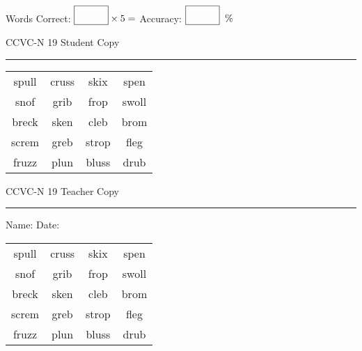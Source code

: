 \documentclass{memoir}
\begin{document}
\small

Words Correct: $\fbox{\phantom{\huge 100}} \times 5 = $ Accuracy: $\fbox{\phantom{\huge 100}}\;\; \%$ 

\vfill

\newpage


\footnotesize \noindent
CCVC-N 19 \hfill Student Copy
\smallskip
\hrule

\Large

\setlength{\tabcolsep}{14pt}
\def\arraystretch{3}

{\selectfont


\begin{vplace}[0.5]
\begin{center}
\begin{tabular}{cccc}
spull & cruss & skix & spen \\
snof & grib                    & frop & swoll \\
breck       & sken & cleb & brom          \\
screm & greb & strop & fleg             \\
fruzz & plun & bluss & drub             \\
\end{tabular}
\end{center}
\end{vplace}

}

\newpage

\footnotesize \noindent
CCVC-N 19 \hfill Teacher Copy
\smallskip
\hrule

\small

\vfill

\noindent
Name: \underline{\hspace{1.75in}} \hfill Date: \underline{\hspace{1in}}

\Large

{\selectfont


\begin{vplace}[0.5]
\begin{center}
\begin{tabular}{cccc}
spull & cruss & skix & spen \\
snof & grib                    & frop & swoll \\
breck       & sken & cleb & brom          \\
screm & greb & strop & fleg             \\
fruzz & plun & bluss & drub             \\
\end{tabular}
\end{center}
\end{vplace}



}
\end{document}
